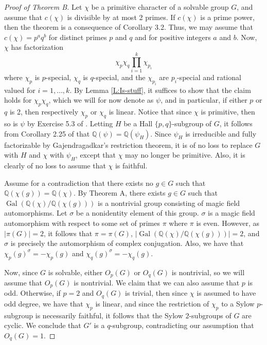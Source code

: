 \documentclass[12pt]{amsart}
\theoremstyle{definition}
\newcommand{\Q}{\mathbb{Q}}
\DeclareMathOperator{\Gal}{Gal}
\begin{document}
\begin{proof}[Proof of Theorem B]
	Let $\chi$ be a primitive character of a solvable group $G$, and assume that $c(\chi)$ is divisible by at most 2 primes. If $c(\chi)$ is a prime power, then the theorem is a consequence of Corollary 3.2. Thus, we may assume that $c(\chi) = p^aq^b$ for distinct primes $p$ and $q$ and for positive integers $a$ and $b$. Now, $\chi$ has factorization
	$$
	\chi_p\chi_q\prod_{i=1}^k \chi_{p_i}
	$$
	where $\chi_p$ is $p$-special, $\chi_q$ is $q$-special, and the $\chi_{p_i}$ are $p_i$-special and rational valued for $i=1,\ldots,k$. By Lemma \ref{L:Is-stuff}, it suffices to show that the claim holds for $\chi_p\chi_q$, which we will for now denote as $\psi$, and in particular, if either $p$ or $q$ is 2, then respectively $\chi_p$ or $\chi_q$ is linear. Notice that since $\chi$ is primitive, then so is $\psi$ by Exercise 5.3 of \cite{Is}. Letting $H$ be a Hall $\{p,q\}$-subgroup of $G$, it follows from Corollary 2.25 of \cite{Is2} that $\Q(\psi) = \Q(\psi_H)$. Since $\psi_H$ is irreducible and fully factorizable by Gajendragadkar's restriction theorem, it is of no loss to replace $G$ with $H$ and $\chi$ with $\psi_H$, except that $\chi$ may no longer be primitive. Also, it is clearly of no loss to assume that $\chi$ is faithful.
	
	Assume for a contradiction that there exists no $g \in G$ such that $\Q(\chi(g)) = \Q(\chi)$. By Theorem A, there exists $g \in G$ such that $\Gal(\Q(\chi)/\Q(\chi(g)))$ is a nontrivial group consisting of magic field automorphisms. Let $\sigma$ be a nonidentity element of this group. $\sigma$ is a magic field automorphism with respect to some set of primes $\pi$ where $\pi$ is even. However, as $|\pi(G)| = 2$, it follows that $\pi = \pi(G)$, $|\Gal(\Q(\chi)/\Q(\chi(g)))| = 2$, and $\sigma$ is precisely the automorphism of complex conjugation. Also, we have that $\chi_p(g)^\sigma = -\chi_p(g)$ and $\chi_q(g)^\sigma = -\chi_q(g)$.
	
	Now, since $G$ is solvable, either $O_p(G)$ or $O_q(G)$ is nontrivial, so we will assume that $O_p(G)$ is nontrivial. We claim that we can also assume that $p$ is odd. Otherwise, if $p = 2$ and $O_q(G)$ is trivial, then since $\chi$ is assumed to have odd degree, we have that $\chi_p$ is linear, and since the restriction of $\chi_p$ to a Sylow $p$-subgroup is necessarily faithful, it follows that the Sylow $2$-subgroups of $G$ are cyclic. We conclude that $G'$ is a $q$-subgroup, contradicting our assumption that $O_q(G) = 1$.
	

\end{proof}
\end{document}
